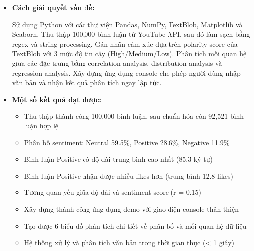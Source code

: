 \begin{itemize}
    \item[-] \textbf{Cách giải quyết vấn đề:}
    
    Sử dụng Python với các thư viện Pandas, NumPy, TextBlob, Matplotlib và Seaborn. Thu thập 100,000 bình luận từ YouTube API, sau đó làm sạch bằng regex và string processing. Gán nhãn cảm xúc dựa trên polarity score của TextBlob với 3 mức độ tin cậy (High/Medium/Low). Phân tích mối quan hệ giữa các đặc trưng bằng correlation analysis, distribution analysis và regression analysis. Xây dựng ứng dụng console cho phép người dùng nhập văn bản và nhận kết quả phân tích ngay lập tức.
    
    \item[-] \textbf{Một số kết quả đạt được:}
        \begin{itemize}
        \item[•] Thu thập thành công 100,000 bình luận, sau chuẩn hóa còn 92,521 bình luận hợp lệ
        \item[•] Phân bố sentiment: Neutral 59.5\%, Positive 28.6\%, Negative 11.9\%
        \item[•] Bình luận Positive có độ dài trung bình cao nhất (85.3 ký tự)
        \item[•] Bình luận Positive nhận được nhiều likes hơn (trung bình 12.8 likes)
        \item[•] Tương quan yếu giữa độ dài và sentiment score (r = 0.15)
        \item[•] Xây dựng thành công ứng dụng demo với giao diện console thân thiện
        \item[•] Tạo được 6 biểu đồ phân tích chi tiết về phân bố và mối quan hệ dữ liệu
        \item[•] Hệ thống xử lý và phân tích văn bản trong thời gian thực (< 1 giây)
        \end{itemize}
\end{itemize}

\newpage
